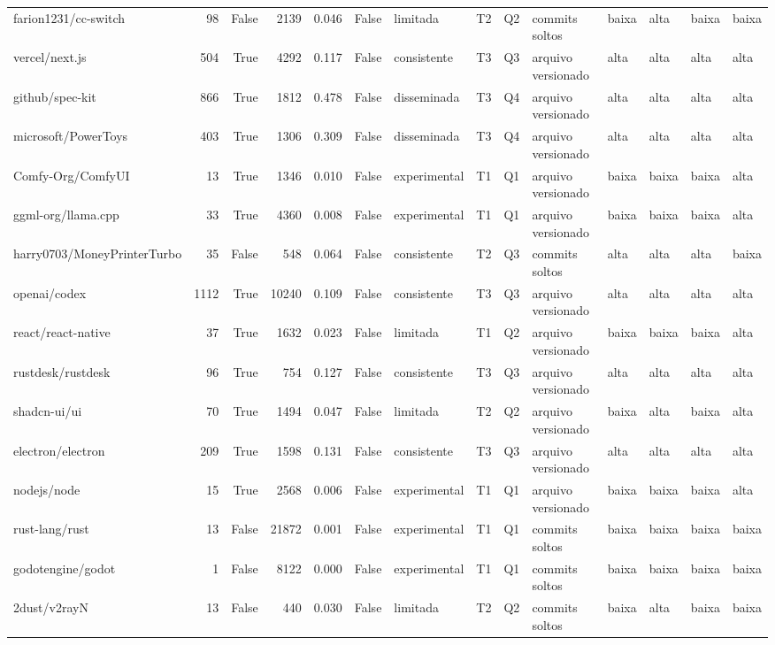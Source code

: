 \begin{tabular}{lrrrrrllllllll}
farion1231/cc-switch & 98 & False & 2139 & 0.046 & False & limitada & T2 & Q2 & commits soltos & baixa & alta & baixa & baixa \\
vercel/next.js & 504 & True & 4292 & 0.117 & False & consistente & T3 & Q3 & arquivo versionado & alta & alta & alta & alta \\
github/spec-kit & 866 & True & 1812 & 0.478 & False & disseminada & T3 & Q4 & arquivo versionado & alta & alta & alta & alta \\
microsoft/PowerToys & 403 & True & 1306 & 0.309 & False & disseminada & T3 & Q4 & arquivo versionado & alta & alta & alta & alta \\
Comfy-Org/ComfyUI & 13 & True & 1346 & 0.010 & False & experimental & T1 & Q1 & arquivo versionado & baixa & baixa & baixa & alta \\
ggml-org/llama.cpp & 33 & True & 4360 & 0.008 & False & experimental & T1 & Q1 & arquivo versionado & baixa & baixa & baixa & alta \\
harry0703/MoneyPrinterTurbo & 35 & False & 548 & 0.064 & False & consistente & T2 & Q3 & commits soltos & alta & alta & alta & baixa \\
openai/codex & 1112 & True & 10240 & 0.109 & False & consistente & T3 & Q3 & arquivo versionado & alta & alta & alta & alta \\
react/react-native & 37 & True & 1632 & 0.023 & False & limitada & T1 & Q2 & arquivo versionado & baixa & baixa & baixa & alta \\
rustdesk/rustdesk & 96 & True & 754 & 0.127 & False & consistente & T3 & Q3 & arquivo versionado & alta & alta & alta & alta \\
shadcn-ui/ui & 70 & True & 1494 & 0.047 & False & limitada & T2 & Q2 & arquivo versionado & baixa & alta & baixa & alta \\
electron/electron & 209 & True & 1598 & 0.131 & False & consistente & T3 & Q3 & arquivo versionado & alta & alta & alta & alta \\
nodejs/node & 15 & True & 2568 & 0.006 & False & experimental & T1 & Q1 & arquivo versionado & baixa & baixa & baixa & alta \\
rust-lang/rust & 13 & False & 21872 & 0.001 & False & experimental & T1 & Q1 & commits soltos & baixa & baixa & baixa & baixa \\
godotengine/godot & 1 & False & 8122 & 0.000 & False & experimental & T1 & Q1 & commits soltos & baixa & baixa & baixa & baixa \\
2dust/v2rayN & 13 & False & 440 & 0.030 & False & limitada & T2 & Q2 & commits soltos & baixa & alta & baixa & baixa \\

\end{tabular}
